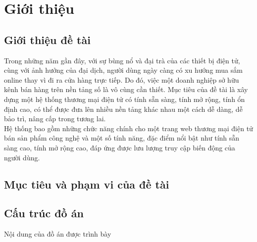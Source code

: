 \chapter{Giới thiệu}


\section{Giới thiệu đề tài}
\noindent Trong những năm gần đây, với sự bùng nổ và đại trà của các thiết bị điện tử, cùng với ảnh hưởng của đại dịch, người dùng ngày càng có xu hướng mua sắm online thay vì đi ra cửa hàng trực tiếp. Do đó, việc một doanh nghiệp sở hữu kênh bán hàng trên nền tảng số là vô cùng cần thiết. Mục tiêu của đề tài là xây dựng một hệ thống thương mại điện tử có tính sẵn sàng, tính mở rộng, tính ổn định cao, có thể được đưa lên nhiều nền tảng khác nhau một cách dễ dàng, dễ bảo trì, nâng cấp trong tương lai. \\

\noindent Hệ thống bao gồm những chức năng chính cho một trang web thương mại điện tử bán sản phẩm công nghệ và một số tính năng, đặc điểm nổi bật như tính sẵn sàng cao, tính mở rộng cao, đáp ứng được lưu lượng truy cập biến động của người dùng.

\section{Mục tiêu và phạm vi của đề tài}

\section{Cấu trúc đồ án}
\noindent Nội dung của đồ án được trình bày 
